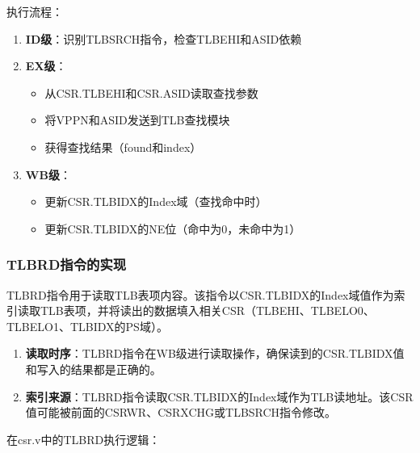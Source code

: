 
执行流程：

\begin{enumerate}
    \item \textbf{ID级}：识别TLBSRCH指令，检查TLBEHI和ASID依赖
    \item \textbf{EX级}：
    \begin{itemize}
        \item 从CSR.TLBEHI和CSR.ASID读取查找参数
        \item 将VPPN和ASID发送到TLB查找模块
        \item 获得查找结果（found和index）
    \end{itemize}
    \item \textbf{WB级}：
    \begin{itemize}
        \item 更新CSR.TLBIDX的Index域（查找命中时）
        \item 更新CSR.TLBIDX的NE位（命中为0，未命中为1）
    \end{itemize}
\end{enumerate}

\subsubsection{TLBRD指令的实现}

TLBRD指令用于读取TLB表项内容。该指令以CSR.TLBIDX的Index域值作为索引读取TLB表项，并将读出的数据填入相关CSR（TLBEHI、TLBELO0、TLBELO1、TLBIDX的PS域）。

\begin{enumerate}
    \item \textbf{读取时序}：TLBRD指令在WB级进行读取操作，确保读到的CSR.TLBIDX值和写入的结果都是正确的。
    
    \item \textbf{索引来源}：TLBRD指令读取CSR.TLBIDX的Index域作为TLB读地址。该CSR值可能被前面的CSRWR、CSRXCHG或TLBSRCH指令修改。
    
\end{enumerate}

在csr.v中的TLBRD执行逻辑：

